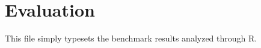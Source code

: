 \documentclass[preprint,authoryear,10pt]{sigplanconf}
\begin{document}
\section{Evaluation}
\label{sec:evaluation}
This file simply typesets the benchmark results analyzed through R.
%
%
\end{document}
